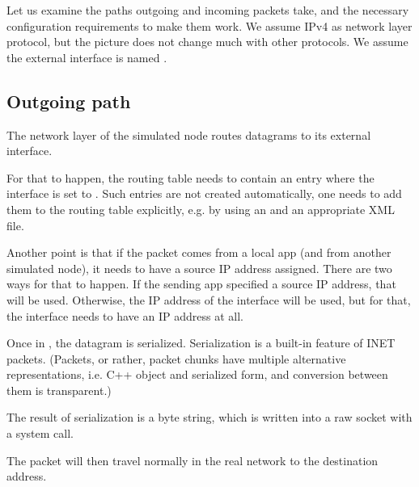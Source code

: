 Let us examine the paths outgoing and incoming packets take, and the
necessary configuration requirements to make them work. We assume IPv4
as network layer protocol, but the picture does not change much with
other protocols. We assume the external interface is named .

\subsection*{Outgoing path}

The network layer of the simulated node routes datagrams to its
 external interface.

For that to happen, the routing table needs to contain an entry
where the interface is set to . Such entries are
not created automatically, one needs to add them to the routing
table explicitly, e.g. by using an 
and an appropriate XML file.

Another point is that if the packet comes from a local app (and from
another simulated node), it needs to have a source IP address assigned.
There are two ways for that to happen. If the sending app specified
a source IP address, that will be used. Otherwise, the IP address
of the  interface will be used, but for that, the interface
needs to have an IP address at all.

Once in , the datagram is serialized.
Serialization is a built-in feature of INET packets. (Packets, or rather,
packet chunks have multiple alternative representations, i.e. C++ object
and serialized form, and conversion between them is transparent.)

The result of serialization is a byte string, which is written into
a raw socket with a  system call.


The packet will then travel normally in the real network to the
destination address.

